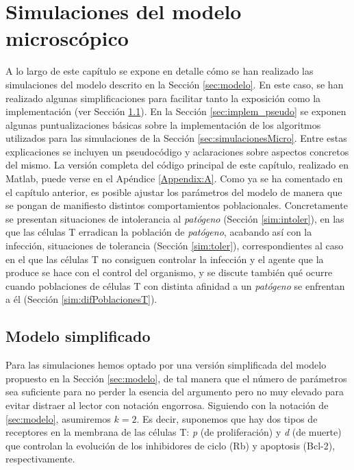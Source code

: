 
\chapter{Simulaciones del modelo microscópico}
\label{cap:simulaciones}

A lo largo de este capítulo se expone en detalle cómo se han realizado las simulaciones del modelo descrito en la Sección \ref{sec:modelo}. En este caso, se han realizado algunas simplificaciones para facilitar tanto la exposición como la implementación (ver Sección \ref{sec:modelo_simplif}). En la Sección \ref{sec:implem_pseudo} se exponen algunas puntualizaciones básicas sobre la implementación de los algoritmos utilizados para las simulaciones de la Sección \ref{sec:simulacionesMicro}. Entre estas explicaciones se incluyen un pseudocódigo y aclaraciones sobre aspectos concretos del mismo. La versión completa del código principal de este capítulo, realizado en Matlab, puede verse en el Apéndice \ref{Appendix:A}. Como ya se ha comentado en el capítulo anterior, es posible ajustar los parámetros del modelo de manera que se  pongan de manifiesto distintos comportamientos poblacionales. Concretamente se presentan situaciones de intolerancia al \textit{patógeno} (Sección \ref{sim:intoler}), en las que las células T erradican la población de \textit{patógeno}, acabando así con la infección, situaciones de tolerancia (Sección \ref{sim:toler}), correspondientes al caso en el que las células T no consiguen controlar la infección y el agente que la produce se hace con el control del organismo, y se discute también qué ocurre cuando poblaciones de células T con distinta afinidad a un \textit{patógeno} se enfrentan a él (Sección \ref{sim:difPoblacionesT}).


\section{Modelo simplificado}
\label{sec:modelo_simplif}

Para las simulaciones hemos optado por una versión simplificada del modelo propuesto en la Sección \ref{sec:modelo}, de tal manera que el número de parámetros sea suficiente para no perder la esencia del argumento pero no muy elevado para evitar distraer al lector con notación engorrosa. Siguiendo con la notación de \ref{sec:modelo}, asumiremos $k=2$. Es decir, suponemos que hay dos tipos de receptores en la membrana de las células T: \textit{p} (de proliferación) y \textit{d} (de muerte) que controlan la evolución de los inhibidores de ciclo (Rb) y apoptosis (Bcl-2), respectivamente.

